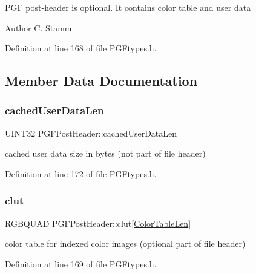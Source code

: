 P\+GF post-\/header is optional. It contains color table and user data \begin{DoxyAuthor}{Author}
C. Stamm 
\end{DoxyAuthor}


Definition at line 168 of file P\+G\+Ftypes.\+h.



\subsection{Member Data Documentation}
\mbox{\label{structPGFPostHeader_a104e3ef6de85dfdbbd867a250fcd82d4}} 
\subsubsection{\texorpdfstring{cachedUserDataLen}{cachedUserDataLen}}
{\footnotesize\ttfamily U\+I\+N\+T32 P\+G\+F\+Post\+Header\+::cached\+User\+Data\+Len}



cached user data size in bytes (not part of file header) 



Definition at line 172 of file P\+G\+Ftypes.\+h.

\mbox{\label{structPGFPostHeader_a3a7faf3091c0faa2e508ecdeb54ea706}} 
\subsubsection{\texorpdfstring{clut}{clut}}
{\footnotesize\ttfamily R\+G\+B\+Q\+U\+AD P\+G\+F\+Post\+Header\+::clut\mbox{[}\mbox{\hyperlink{PGFtypes_8h_a9d98169485fbcb79dd2277c567f3f27d}{Color\+Table\+Len}}\mbox{]}}



color table for indexed color images (optional part of file header) 



Definition at line 169 of file P\+G\+Ftypes.\+h.

\mbox{\label{structPGFPostHeader_aeeb6e57e8343eb3d42406f0baf3ae6e1}} 
